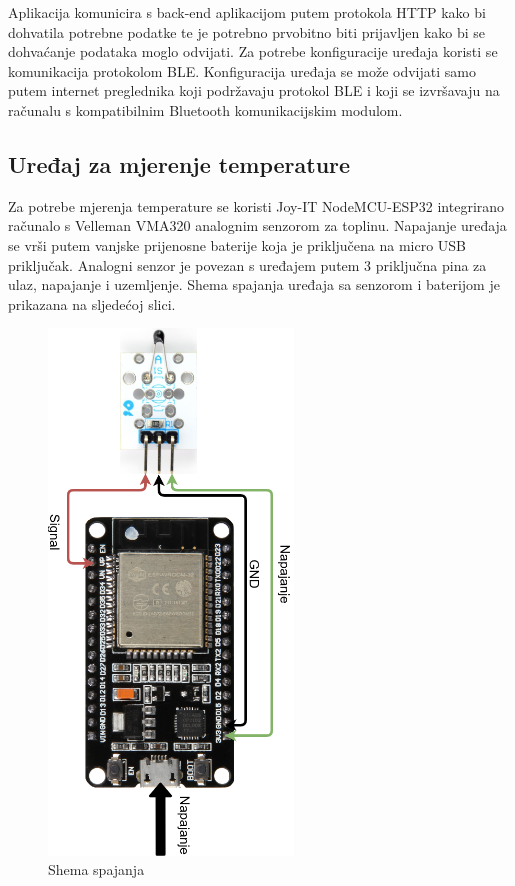 \documentclass[times, utf8, diplomski]{fer}
\begin{document}
Aplikacija komunicira s back-end aplikacijom putem protokola HTTP kako bi dohvatila potrebne podatke te je potrebno prvobitno biti prijavljen kako bi se dohvaćanje podataka moglo odvijati. Za potrebe konfiguracije uređaja koristi se komunikacija protokolom BLE. Konfiguracija uređaja se može odvijati samo putem internet preglednika koji podržavaju protokol BLE i koji se izvršavaju na računalu s kompatibilnim Bluetooth komunikacijskim modulom.

\subsection{Uređaj za mjerenje temperature}
Za potrebe mjerenja temperature se koristi Joy-IT NodeMCU-ESP32 integrirano računalo s Velleman VMA320 analognim senzorom za toplinu. Napajanje uređaja se vrši putem vanjske prijenosne baterije koja je priključena na micro USB priključak. Analogni senzor je povezan s uređajem putem 3 priključna pina za ulaz, napajanje i uzemljenje. Shema spajanja uređaja sa senzorom i baterijom je prikazana na sljedećoj slici.
\begin{figure}[H]
    \centering
    \includegraphics[width=6.5cm, angle=90]{images/shema.png}
    \caption{Shema spajanja}
    \label{fig:device}
\end{figure}
\end{document}
